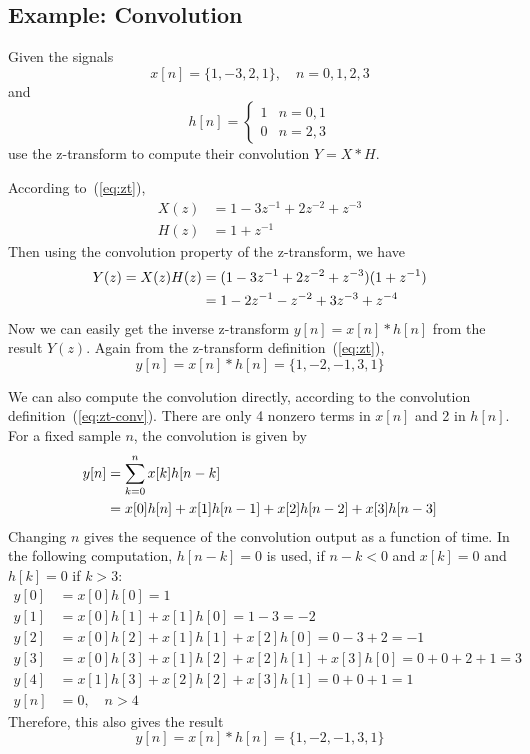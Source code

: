 \subsection{Example: Convolution}

Given the signals 
\begin{equation}
x[n] = \{1, -3, 2, 1\}, \quad n = 0,1,2,3
\end{equation}
and 
\begin{equation}
h[n] = \left\{\begin{array}{ll}
                        1 &  n=0,1\\
                        0 &  n=2,3
          \end{array}\right.
\end{equation}
use the z-transform to compute their convolution $Y = X \ast H$.

According to~(\ref{eq:zt}),
\begin{align}
X(z) &= 1-3z^{-1}+2z^{-2}+z^{-3}\\
H(z) &= 1+z^{-1}
\end{align}
Then using the convolution property of the z-transform, we have 
\begin{align}
Y(z)=X(z)H(z)
&= (1-3z^{-1}+2z^{-2}+z^{-3})(1+z^{-1}) \notag\\
&= 1-2z^{-1}-z^{-2}+3z^{-3}+z^{-4}
\end{align}
Now we can easily get the inverse z-transform $y[n]=x[n] \ast h[n]$ from the
result $Y(z)$. Again from the z-transform
definition~(\ref{eq:zt}),
\begin{equation}
y[n] = x[n] \ast h[n] = \{1,-2, -1, 3, 1\}
\end{equation}

We can also compute the convolution directly, according to the
convolution definition~(\ref{eq:zt-conv}). There are only 4 nonzero
terms in $x[n]$ and 2 in $h[n]$. For a fixed sample $n$, the
convolution is given by
\begin{align}
y[n] &= \sum_{k=0}^{n} x[k] h[n-k] \notag\\
     &= x[0] h[n] + x[1] h[n-1] + x[2] h[n-2] + x[3] h[n-3]
\end{align}
Changing $n$ gives the sequence of the convolution output as a
function of time. In the following computation, $h[n-k]=0$ is used,
if $n-k<0$ and $x[k]=0$ and $h[k]=0$ if $k>3$:
\begin{align*}
y[0] &= x[0] h[0] = 1\\
y[1] &= x[0] h[1] + x[1] h[0] = 1-3 = -2\\
y[2] &= x[0] h[2] + x[1] h[1] + x[2] h[0] = 0-3+2 = -1\\
y[3] &= x[0] h[3] + x[1] h[2] + x[2] h[1] +x[3] h[0] = 0+0+2+1 = 3\\
y[4] &= x[1] h[3] + x[2] h[2] + x[3] h[1] = 0+0+1 = 1\\
y[n] &= 0, \quad n>4
\end{align*}
Therefore, this also gives the result
\begin{equation}
y[n] = x[n] \ast h[n] = \{1,-2, -1, 3, 1\}
\end{equation}

